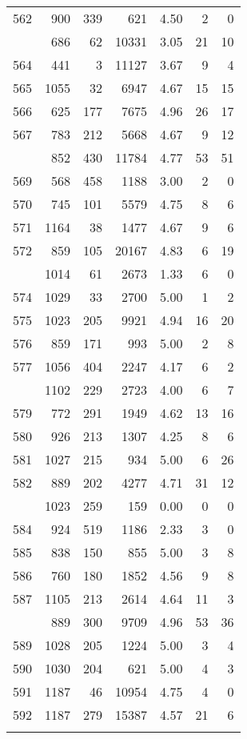 \documentclass[
]{article}
\begin{document}
\begin{table}
\begin{tabular}[t]{lrrrrrr}
562 & 900 & 339 & 621 & 4.50 & 2 & 0\\
\addlinespace
563 & 686 & 62 & 10331 & 3.05 & 21 & 10\\
564 & 441 & 3 & 11127 & 3.67 & 9 & 4\\
565 & 1055 & 32 & 6947 & 4.67 & 15 & 15\\
566 & 625 & 177 & 7675 & 4.96 & 26 & 17\\
567 & 783 & 212 & 5668 & 4.67 & 9 & 12\\
\addlinespace
568 & 852 & 430 & 11784 & 4.77 & 53 & 51\\
569 & 568 & 458 & 1188 & 3.00 & 2 & 0\\
570 & 745 & 101 & 5579 & 4.75 & 8 & 6\\
571 & 1164 & 38 & 1477 & 4.67 & 9 & 6\\
572 & 859 & 105 & 20167 & 4.83 & 6 & 19\\
\addlinespace
573 & 1014 & 61 & 2673 & 1.33 & 6 & 0\\
574 & 1029 & 33 & 2700 & 5.00 & 1 & 2\\
575 & 1023 & 205 & 9921 & 4.94 & 16 & 20\\
576 & 859 & 171 & 993 & 5.00 & 2 & 8\\
577 & 1056 & 404 & 2247 & 4.17 & 6 & 2\\
\addlinespace
578 & 1102 & 229 & 2723 & 4.00 & 6 & 7\\
579 & 772 & 291 & 1949 & 4.62 & 13 & 16\\
580 & 926 & 213 & 1307 & 4.25 & 8 & 6\\
581 & 1027 & 215 & 934 & 5.00 & 6 & 26\\
582 & 889 & 202 & 4277 & 4.71 & 31 & 12\\
\addlinespace
583 & 1023 & 259 & 159 & 0.00 & 0 & 0\\
584 & 924 & 519 & 1186 & 2.33 & 3 & 0\\
585 & 838 & 150 & 855 & 5.00 & 3 & 8\\
586 & 760 & 180 & 1852 & 4.56 & 9 & 8\\
587 & 1105 & 213 & 2614 & 4.64 & 11 & 3\\
\addlinespace
588 & 889 & 300 & 9709 & 4.96 & 53 & 36\\
589 & 1028 & 205 & 1224 & 5.00 & 3 & 4\\
590 & 1030 & 204 & 621 & 5.00 & 4 & 3\\
591 & 1187 & 46 & 10954 & 4.75 & 4 & 0\\
592 & 1187 & 279 & 15387 & 4.57 & 21 & 6\\
\addlinespace

\end{tabular}
\end{table}
\end{document}
